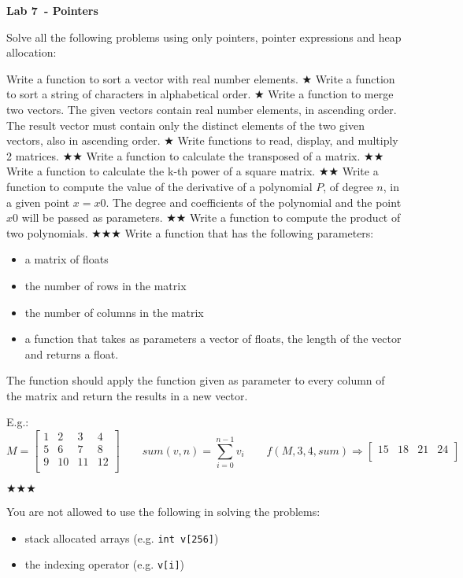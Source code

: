 \documentclass{exam}
\newcommand\labnr{7}
\newcommand\lab{Lab \labnr\ - Pointers}
\newcommand\lvlez{$\bigstar$}
\newcommand\lvlmed{\lvlez\lvlez}
\newcommand\lvlhard{\lvlmed\lvlez}
\begin{document}
\begin{center}
   \vspace*{0cm}
   \bfseries\LARGE
   \lab
   \vspace*{1cm}
\end{center}

\noindent Solve all the following problems using only pointers, pointer expressions and heap allocation:
\begin{questions}
   \question Write a function to sort a vector with real number elements. \lvlez
   \question Write a function to sort a string of characters in alphabetical order. \lvlez
   \question Write a function to merge two vectors. The given vectors contain real number elements, in ascending order. The result vector must contain only the distinct elements of the two given vectors, also in ascending order. \lvlez
   \question Write functions to read, display, and multiply 2 matrices. \lvlmed
   \question Write a function to calculate the transposed of a matrix. \lvlmed
   \question Write a function to calculate the k-th power of a square matrix. \lvlmed
   \question Write a function to compute the value of the derivative of a polynomial $P$, of degree $n$, in a given point $x=x0$. The degree and  coefficients of the polynomial and the point $x0$ will be passed as parameters. \lvlmed
   \question Write a function to compute the product of two polynomials. \lvlhard
   \question Write a function that has the following parameters:
      \begin{itemize}
         \item a matrix of floats 
         \item the number of rows in the matrix
         \item the number of columns in the matrix
         \item a function that takes as parameters a vector of floats, the length of the vector and returns a float.
      \end{itemize}
   The function should apply the function given as parameter to every column of the matrix and return the results in a new vector. 
   
   E.g.:
   \[
   M = 
  \left[ {\begin{array}{cccc}
    1 & 2 & 3 & 4 \\
    5 & 6 & 7 & 8 \\
    9 & 10 & 11 & 12 \\
  \end{array} } \right] 
  \quad 
  \quad 
  sum(v, n) = \sum_{i=0}^{n-1} v_i
  \quad
  \quad 
  f(M, 3, 4, sum) \Rightarrow \left[ {\begin{array}{cccc}
    15 & 18 & 21 & 24 \\
  \end{array} } \right]
   \]
   
   \lvlhard
\end{questions}
\medskip
\noindent You are not allowed to use the following in solving the problems:
\begin{itemize}
   \item stack allocated arrays (e.g. \verb|int v[256]|)
   \item the indexing operator (e.g. \verb|v[i]|)
\end{itemize}
\medskip
\end{document}
